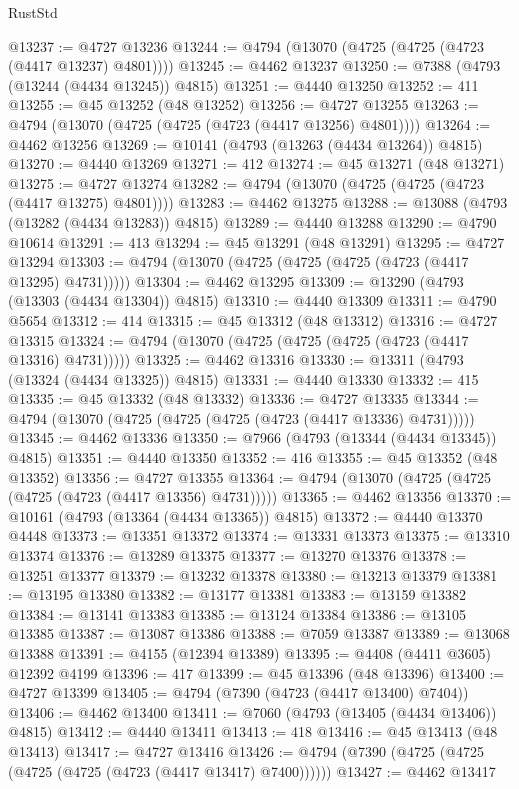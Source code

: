 \begin{lexlean}{RustStd}
\begin{coremodule}
@13237 := @4727 @13236
@13244 := @4794 (@13070 (@4725 (@4725 (@4723 (@4417 @13237) @4801))))
@13245 := @4462 @13237
@13250 := @7388 (@4793 (@13244 (@4434 @13245)) @4815)
@13251 := @4440 @13250
@13252 := 411
@13255 := @45 @13252 (@48 @13252)
@13256 := @4727 @13255
@13263 := @4794 (@13070 (@4725 (@4725 (@4723 (@4417 @13256) @4801))))
@13264 := @4462 @13256
@13269 := @10141 (@4793 (@13263 (@4434 @13264)) @4815)
@13270 := @4440 @13269
@13271 := 412
@13274 := @45 @13271 (@48 @13271)
@13275 := @4727 @13274
@13282 := @4794 (@13070 (@4725 (@4725 (@4723 (@4417 @13275) @4801))))
@13283 := @4462 @13275
@13288 := @13088 (@4793 (@13282 (@4434 @13283)) @4815)
@13289 := @4440 @13288
@13290 := @4790 @10614
@13291 := 413
@13294 := @45 @13291 (@48 @13291)
@13295 := @4727 @13294
@13303 := @4794 (@13070 (@4725 (@4725 (@4725 (@4723 (@4417 @13295) @4731)))))
@13304 := @4462 @13295
@13309 := @13290 (@4793 (@13303 (@4434 @13304)) @4815)
@13310 := @4440 @13309
@13311 := @4790 @5654
@13312 := 414
@13315 := @45 @13312 (@48 @13312)
@13316 := @4727 @13315
@13324 := @4794 (@13070 (@4725 (@4725 (@4725 (@4723 (@4417 @13316) @4731)))))
@13325 := @4462 @13316
@13330 := @13311 (@4793 (@13324 (@4434 @13325)) @4815)
@13331 := @4440 @13330
@13332 := 415
@13335 := @45 @13332 (@48 @13332)
@13336 := @4727 @13335
@13344 := @4794 (@13070 (@4725 (@4725 (@4725 (@4723 (@4417 @13336) @4731)))))
@13345 := @4462 @13336
@13350 := @7966 (@4793 (@13344 (@4434 @13345)) @4815)
@13351 := @4440 @13350
@13352 := 416
@13355 := @45 @13352 (@48 @13352)
@13356 := @4727 @13355
@13364 := @4794 (@13070 (@4725 (@4725 (@4725 (@4723 (@4417 @13356) @4731)))))
@13365 := @4462 @13356
@13370 := @10161 (@4793 (@13364 (@4434 @13365)) @4815)
@13372 := @4440 @13370 @4448
@13373 := @13351 @13372
@13374 := @13331 @13373
@13375 := @13310 @13374
@13376 := @13289 @13375
@13377 := @13270 @13376
@13378 := @13251 @13377
@13379 := @13232 @13378
@13380 := @13213 @13379
@13381 := @13195 @13380
@13382 := @13177 @13381
@13383 := @13159 @13382
@13384 := @13141 @13383
@13385 := @13124 @13384
@13386 := @13105 @13385
@13387 := @13087 @13386
@13388 := @7059 @13387
@13389 := @13068 @13388
@13391 := @4155 (@12394 @13389)
@13395 := @4408 (@4411 @3605) @12392 @4199
@13396 := 417
@13399 := @45 @13396 (@48 @13396)
@13400 := @4727 @13399
@13405 := @4794 (@7390 (@4723 (@4417 @13400) @7404))
@13406 := @4462 @13400
@13411 := @7060 (@4793 (@13405 (@4434 @13406)) @4815)
@13412 := @4440 @13411
@13413 := 418
@13416 := @45 @13413 (@48 @13413)
@13417 := @4727 @13416
@13426 := @4794 (@7390 (@4725 (@4725 (@4725 (@4725 (@4723 (@4417 @13417) @7400))))))
@13427 := @4462 @13417

\end{coremodule}
\end{lexlean}
